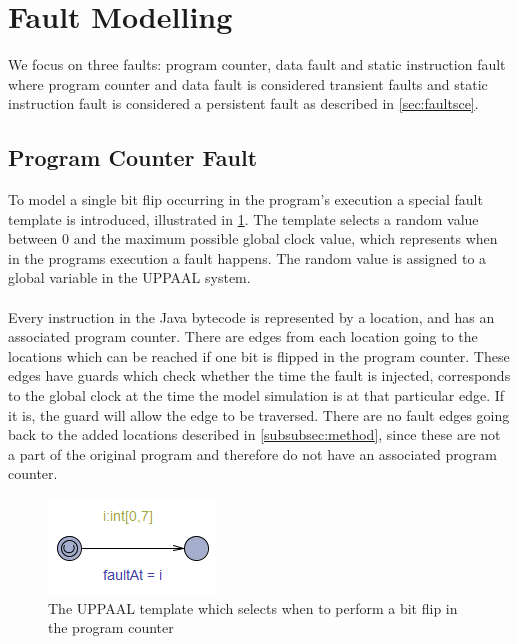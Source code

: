 \section{Fault Modelling}
We focus on three faults: program counter, data fault and static instruction fault where program counter and data fault is considered transient faults and static instruction fault is considered a persistent fault as described in \cref{sec:faultsce}.

\subsection{Program Counter Fault}

To model a single bit flip occurring in the program's execution a special fault template is introduced, illustrated in \cref{fig:faultTime}. The template selects a random value between $0$ and the maximum possible global clock value, which represents when in the programs execution a fault happens. The random value is assigned to a global variable in the UPPAAL system.\\\\
Every instruction in the Java bytecode is represented by a location, and has an associated program counter. There are edges from each location going to the locations which can be reached if one bit is flipped in the program counter. These edges have guards which check whether the time the fault is injected, corresponds to the global clock at the time the model simulation is at that particular edge. If it is, the guard will allow the edge to be traversed. There are no fault edges going back to the added locations described in \cref{subsubsec:method}, since these are not a part of the original program and therefore do not have an associated program counter.
\begin{figure}[H]
\centering
\includegraphics{figures/fault.PNG}
\caption{The UPPAAL template which selects when to perform a bit flip in the program counter}
\label{fig:faultTime}
\end{figure}

